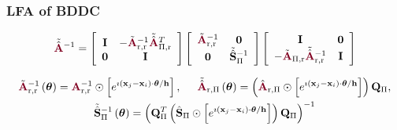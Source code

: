 \documentclass{beamer}
\begin{document}
\begin{frame}
\begin{center}
\frametitle{LFA of BDDC}

\begin{equation}
\tilde{\hat{\color{burgundy} \mathbf{A}}}\color{black}^{-1} =
\left[ \begin{array}{c c}
\mathbf{I}  &  -\tilde{\color{burgundy}\mathbf{A}}_{\text{r}, \text{r}}^{-1} \tilde{\hat{\color{burgundy}\mathbf{A}}}\color{black}_{\Pi, \text{r}}^T  \\
\mathbf{0}  &  \mathbf{I}                                                                                                                             \\
\end{array} \right]
\left[ \begin{array}{c c}
\tilde{\color{burgundy}\mathbf{A}}_{\text{r}, \text{r}}^{-1}  &  \mathbf{0}                                        \\
\mathbf{0}                                                    &  \tilde{\hat{\mathbf{S}}}\color{black}_{\Pi}^{-1}  \\
\end{array} \right]
\left[ \begin{array}{c c}
\mathbf{I}                                                                                                                           &  \mathbf{0}  \\
-\tilde{\color{burgundy}\mathbf{A}}_{\Pi, \text{r}} \tilde{\hat{\color{burgundy}\mathbf{A}}}\color{black}_{\text{r}, \text{r}}^{-1}  &  \mathbf{I}  \\
\end{array} \right]
\end{equation}

\begin{equation}
\begin{gathered}
\tilde{\color{burgundy}\mathbf{A}}_{\text{r}, \text{r}}^{-1} \left( \boldsymbol{\theta} \right) = {\color{burgundy}\mathbf{A}}_{\text{r}, \text{r}}^{-1} \odot \left[ e^{\imath \left( \mathbf{x}_j - \mathbf{x}_i \right) \cdot \boldsymbol{\theta} / \mathbf{h}} \right],
\hspace{5mm}
\tilde{\hat{\color{burgundy}\mathbf{A}}}\color{black}_{\text{r}, \Pi} \left( \boldsymbol{\theta} \right) = \left( \hat{\color{burgundy}\mathbf{A}}_{\text{r}, \Pi} \odot \left[ e^{\imath \left( \mathbf{x}_j - \mathbf{x}_i \right) \cdot \boldsymbol{\theta} / \mathbf{h}} \right] \right) \mathbf{Q}_{\Pi},\\
\tilde{\hat{\mathbf{S}}}_{\Pi}^{-1} \left( \boldsymbol{\theta} \right) = \left( \mathbf{Q}_{\Pi}^T \left( \hat{\mathbf{S}}_{\Pi} \odot \left[ e^{\imath \left( \mathbf{x}_j - \mathbf{x}_i \right) \cdot \boldsymbol{\theta} / \mathbf{h}} \right] \right) \mathbf{Q}_{\Pi} \right)^{-1}
\end{gathered}
\end{equation}


\end{center}
\end{frame}
\end{document}
